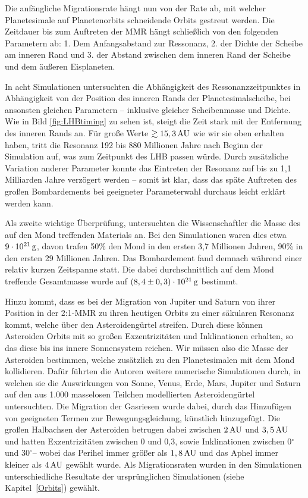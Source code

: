 \documentclass[12pt,a4paper,twoside]{article}
\renewcommand{\cite}{\citep}
\newcommand{\refsec}[1]{siehe Kapitel~\ref{#1}}
\newcommand{\degree}{$^\circ$}
\begin{document}
Die anfängliche Migrationsrate hängt nun von der Rate ab, mit welcher Planetesimale auf Planetenorbits schneidende Orbits gestreut werden. Die Zeitdauer bis zum Auftreten der MMR hängt schließlich von den folgenden Parametern ab:
1. Dem Anfangsabstand zur Ressonanz, 2. der Dichte der Scheibe am inneren Rand und 3. der Abstand zwischen dem inneren Rand der Scheibe und dem äußeren Eisplaneten\cite{Gomes2005}.

In acht Simulationen untersuchten \cite{Gomes2005} die Abhängigkeit des Ressonanzzeitpunktes in Abhängigkeit von der Position des inneren Rands der Planetesimalscheibe, bei ansonsten gleichen Parametern – inklusive gleicher Scheibenmasse und Dichte. Wie in Bild \ref{fig:LHBtiming} zu sehen ist, steigt die Zeit stark mit der Entfernung des inneren Rands an. Für große Werte $\gtrsim \unit[15,3]{AU}$ wie wir sie oben erhalten haben, tritt die Resonanz 192 bis 880 Millionen Jahre nach Beginn der Simulation auf, was zum Zeitpunkt des LHB passen würde. %
Durch zusätzliche Variation anderer Parameter konnte das Eintreten der Resonanz auf bis zu 1,1 Milliarden Jahre\cite{Gomes2005} verzögert werden – somit ist klar, dass das späte Auftreten des großen Bombardements bei geeigneter Parameterwahl durchaus leicht erklärt werden kann.

Als zweite wichtige Überprüfung, untersuchten die Wissenschaftler die Masse des auf den Mond treffenden Materials an. Bei den Simulationen waren dies etwa $\unit[9 \cdot 10^{21}]{g}$, davon trafen 50\% den Mond in den ersten 3,7 Millionen Jahren, 90\% in den ersten 29 Millionen Jahren. Das Bombardement fand demnach während einer relativ kurzen Zeitspanne statt. Die dabei durchschnittlich auf dem Mond treffende Gesamtmasse wurde auf $\unit[\left(8,4 \pm 0,3\right) \cdot 10^{21}]{g}$ bestimmt\cite{Gomes2005}.

Hinzu kommt, dass es bei der Migration von Jupiter und Saturn von ihrer Position in der 2:1-MMR zu ihren heutigen Orbits zu einer säkularen Resonanz kommt, welche über den Asteroidengürtel streifen. %
Durch diese können Asteroiden Orbits mit so großen Exzentrizitäten und Inklinationen erhalten, so das diese bis ins innere Sonnensystem reichen. Wir müssen also die Masse der Asteroiden bestimmen, welche zusätzlich zu den Planetesimalen %
mit dem Mond kollidieren.
Dafür führten die Autoren weitere numerische Simulationen durch, in welchen sie die Auswirkungen von Sonne, Venus, Erde, Mars, Jupiter und Saturn auf den aus 1.000 masselosen Teilchen modellierten Asteroidengürtel untersuchten.
Die Migration der Gasriesen wurde dabei, durch das Hinzufügen von geeigneten Termen zur Bewegungsgleichung, künstlich hinzugefügt. %
Die großen Halbachsen der Asteroiden betrugen dabei zwischen $\unit[2]{AU}$ und $\unit[3,5]{AU}$ und hatten Exzentrizitäten zwischen 0 und 0,3, sowie Inklinationen zwischen 0\degree und 30\degree – wobei das Perihel immer größer als $\unit[1,8]{AU}$ und das Aphel immer kleiner als $\unit[4]{AU}$ gewählt wurde. %
Als Migrationsraten wurden in den Simulationen unterschiedliche Resultate der ursprünglichen Simulationen (\refsec{Orbits}) gewählt. %
\end{document}

